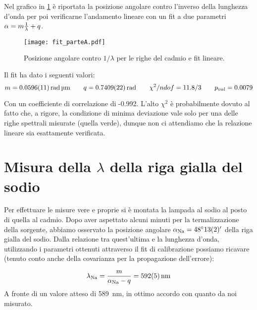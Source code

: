 	Nel grafico in \figurename{ \ref{fig:fit_a}} è riportata la posizione angolare contro l'inverso della
	lunghezza d'onda per poi verificarne l'andamento lineare con un fit a
	due parametri $\alpha = m \frac{1}{\lambda} + q $.

	\begin{figure} [h]
		\centering
		\texttt{[image: fit\_parteA.pdf]}
		\caption{Posizione angolare contro $1/\lambda$ per le righe del cadmio e fit lineare.}
		\label{fig:fit_a}
	\end{figure}

	Il fit ha dato i seguenti valori:
	$$m = \SI{0.0596 \pm 0.0011}{\radian\um} \qquad  q= \SI{0.7409 \pm 0.0022}{\radian} \qquad \chi^2/ndof = 11.8/3 \qquad  p_{val} = 0.0079 $$
	
	Con un coefficiente di correlazione di -0.992. L'alto $\chi^2$ è probabilmente
	dovuto al fatto che, a rigore, la condizione di minima deviazione vale solo
	per una delle righe spettrali misurate (quella verde), dunque non ci attendiamo
	che la relazione lineare sia esattamente verificata.

\section{Misura della $\lambda$ della riga gialla del sodio}
	Per effettuare le misure vere e proprie si è montata la lampada al sodio al posto di quella al cadmio.
	Dopo aver aspettato alcuni minuti per la
	termalizzazione della sorgente, abbiamo osservato la posizione angolare
	$\alpha_{\text{Na}} = \angerr{48}{13(2)}$ della riga gialla del sodio.
	Dalla relazione tra quest'ultima e la lunghezza d'onda, utilizzando i parametri
	ottenuti attraverso il fit di calibrazione possiamo ricavare (tenuto conto
	anche della covarianza per la propagazione dell'errore):

	\begin{equation}
		\lambda_{\text{Na}} = \frac{m}{\alpha_{\text{Na}} - q} = \SI{592 (5)}{\nm}
	\end{equation}
	A fronte di un valore atteso di \SI{589}{\nm}, in ottimo accordo con quanto da noi misurato.
